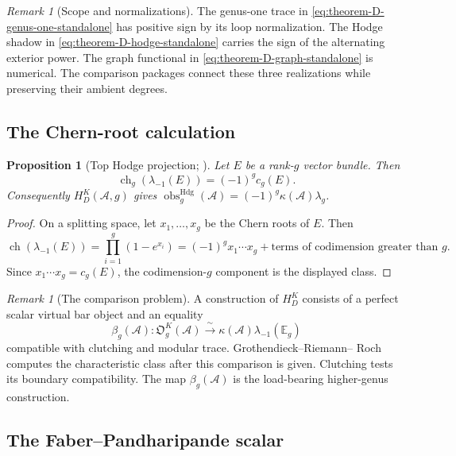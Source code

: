 \documentclass[11pt]{article}
\theoremstyle{plain}
\newtheorem{proposition}[theorem]{Proposition}
\theoremstyle{definition}
\theoremstyle{remark}
\newtheorem{remark}[theorem]{Remark}
\newcommand{\cA}{\mathcal{A}}
\begin{document}
\begin{remark}[Scope and normalizations]
\label{rem:thmD-scope}
\label{rem:genus-1-anchor}
The genus-one trace in
\eqref{eq:theorem-D-genus-one-standalone} has positive sign by its
loop normalization.  The Hodge shadow in
\eqref{eq:theorem-D-hodge-standalone} carries the sign of the
alternating exterior power.  The graph functional in
\eqref{eq:theorem-D-graph-standalone} is numerical.  The comparison
packages connect these three realizations while preserving their
ambient degrees.
\end{remark}

\subsection{The Chern-root calculation}
\label{subsec:thmD-proof}

\begin{proposition}[Top Hodge projection;
\ClaimStatusProvedHere]
\label{prop:scalar-obs-hodge-euler}
\label{lem:T4-shared-input}
Let \(E\) be a rank-\(g\) vector bundle.  Then
\[
 \operatorname{ch}_g(\lambda_{-1}(E))
 =(-1)^g c_g(E).
\]
Consequently \(H_D^K(\cA,g)\) gives
\(\operatorname{obs}^{\mathrm{Hdg}}_g(\cA)
=(-1)^g\kappa(\cA)\lambda_g\).
\end{proposition}

\begin{proof}
On a splitting space, let \(x_1,\ldots,x_g\) be the Chern roots of
\(E\).  Then
\[
 \operatorname{ch}(\lambda_{-1}(E))
 =\prod_{i=1}^g(1-e^{x_i})
 =(-1)^g x_1\cdots x_g
  +\text{terms of codimension greater than }g.
\]
Since \(x_1\cdots x_g=c_g(E)\), the codimension-\(g\) component is the
displayed class.
\end{proof}

\begin{remark}[The comparison problem]
\label{rem:T4-shared-input}
\label{rem:clutching-gap-resolved}
A construction of \(H_D^K\) consists of a perfect scalar virtual bar
object and an equality
\[
 \beta_g(\cA)\colon
 \mathfrak O_g^K(\cA)
 \xrightarrow{\ \sim\ }
 \kappa(\cA)\lambda_{-1}(\mathbb E_g)
\]
compatible with clutching and modular trace.  Grothendieck--Riemann--
Roch computes the characteristic class after this comparison is
given.  Clutching tests its boundary compatibility.  The map
\(\beta_g(\cA)\) is the load-bearing higher-genus construction.
\end{remark}

\subsection{The Faber--Pandharipande scalar}
\end{document}
